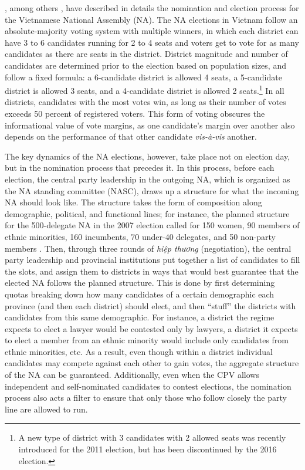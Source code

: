 \documentclass[12pt]{article}\usepackage[]{graphicx}\usepackage[]{color}
\newcommand{\1}{\mathbbm{1}}
\begin{document}
\cite{MaleskySchuler2011}, among others \citep[e.g][]{Gainsborough2005}, have described in details the nomination and election process for the Vietnamese National Assembly (NA). The NA elections in Vietnam follow an absolute-majority voting system with multiple winners, in which each district can have 3 to 6 candidates running for 2 to 4 seats and voters get to vote for as many candidates as there are seats in the district. District magnitude and number of candidates are determined prior to the election based on population sizes, and follow a fixed formula: a 6-candidate district is allowed 4 seats, a 5-candidate district is allowed 3 seats, and a 4-candidate district is allowed 2 seats.\footnote{A new type of district with 3 candidates with 2 allowed seats was recently introduced for the 2011 election, but has been discontinued by the 2016 election.} In all districts, candidates with the most votes win, as long as their number of votes exceeds 50 percent of registered voters. This form of voting obscures the informational value of vote margins, as one candidate's margin over another also depends on the performance of that other candidate \textit{vis-\`{a}-vis} another.

The key dynamics of the NA elections, however, take place not on election day, but in the nomination process that precedes it. In this process, before each election, the central party leadership in the outgoing NA, which is organized as the NA standing committee (NASC), draws up a structure for what the incoming NA should look like. The structure takes the form of composition along demographic, political, and functional lines; for instance, the planned structure for the 500-delegate NA in the 2007 election called for 150 women, 90 members of ethnic minorities, 160 incumbents, 70 under-40 delegates, and 50 non-party members  \citep[506]{MaleskySchuler2011}. Then, through three rounds of \textit{hiệp thương} (negotiation), the central party leadership and provincial institutions put together a list of candidates to fill the slots, and assign them to districts in ways that would best guarantee that the elected NA follows the planned structure. This is done by first determining quotas breaking down how many candidates of a certain demographic each province (and then each district) should elect, and then ``stuff'' the districts with candidates from this same demographic. For instance, a district the regime expects to elect a lawyer would be contested only by lawyers, a district it expects to elect a member from an ethnic minority would include only candidates from ethnic minorities, etc. As a result, even though within a district individual candidates may compete against each other to gain votes, the aggregate structure of the NA can be guaranteed. Additionally, even when the CPV allows independent and self-nominated candidates to contest elections, the nomination process also acts a filter to ensure that only those who follow closely the party line are allowed to run.
\end{document}
